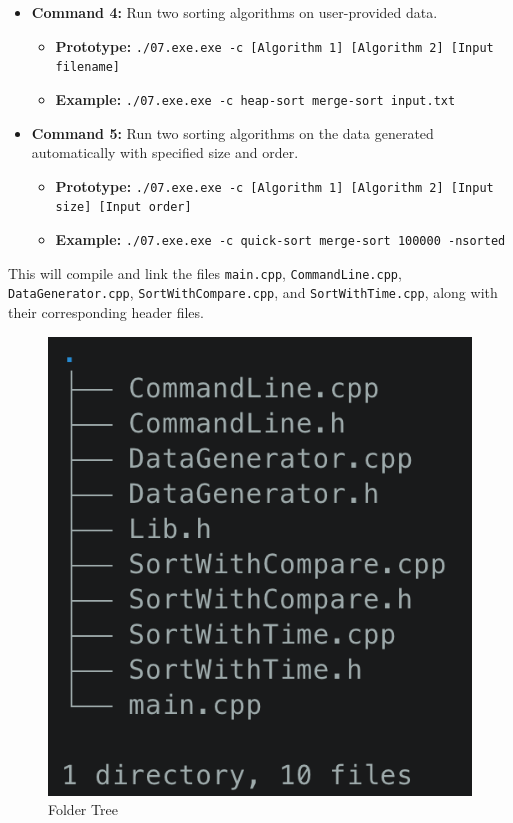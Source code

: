 \begin{enumerate}
\begin{itemize}
    \item \textbf{Command 4:} Run two sorting algorithms on user-provided data.
        \begin{itemize}[label=--]
            \item \textbf{Prototype:} \texttt{./07.exe.exe -c [Algorithm 1] [Algorithm 2] [Input filename]}
            \item \textbf{Example:} \texttt{./07.exe.exe -c heap-sort merge-sort input.txt}
        \end{itemize}

    \item \textbf{Command 5:} Run two sorting algorithms on the data generated automatically with specified size and order.
        \begin{itemize}[label=--]
            \item \textbf{Prototype:} \texttt{./07.exe.exe -c [Algorithm 1] [Algorithm 2] [Input size] [Input order]}
            \item \textbf{Example:} \texttt{./07.exe.exe -c quick-sort merge-sort 100000 -nsorted}
        \end{itemize}
\end{itemize}

\end{enumerate}

This will compile and link the files \texttt{main.cpp}, \texttt{CommandLine.cpp}, \texttt{DataGenerator.cpp}, \texttt{SortWithCompare.cpp}, and \texttt{SortWithTime.cpp}, along with their corresponding header files.

\begin{figure}[h]
    \centering
    \includegraphics[scale=0.45]{Figures/0. General/tree_folder.png}
    \caption{Folder Tree}
    \label{fig:enter-label}
\end{figure}